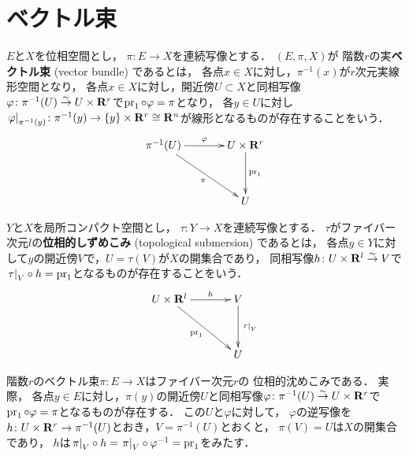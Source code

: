 \section{ベクトル束}
\begin{leftbar}
\begin{DFN}
  \(E\)と\(X\)を位相空間とし，
  \(\pi\colon E\to X\)を連続写像とする．
  \((E,\pi,X)\)が
  階数\(r\)の実\textbf{ベクトル束} (vector bundle) であるとは，
  各点\(x\in X\)に対し，\(\pi^{-1}(x)\)が\(r\)次元実線形空間となり，
  各点\(x\in X\)に対し，開近傍\(U\subset X\)と同相写像\(
    \varphi\colon \pi^{-1}(U)\simar U\times \rr^r
  \)で\(\pr_1\circ\varphi=\pi\)となり，
  各\(y\in U\)に対し\(
    \mres[\varphi]{\pi^{-1}(y)}\colon 
    \pi^{-1}(y)\to \{y\}\times\rr^r\cong \rr^n
  \)が線形となるものが存在することをいう．
  \[\vcenter{\xymatrix@C=36pt@R=36pt{
    \pi^{-1}(U)
    \ar[dr]_-{\pi}
    \ar[r]^-{\varphi}
    &
    U\times \rr^r
    \ar[d]^-{\pr_1}
    \\
    &
    U
  }}\]
\end{DFN}  
\end{leftbar}

\begin{leftbar}
\begin{DFN}[{\cite[Def.3.3.1]{KS90}}]
  \(Y\)と\(X\)を局所コンパクト空間とし，
  \(\tau\colon Y\to X\)を連続写像とする．
  \(\tau\)がファイバー次元\(l\)の\textbf{位相的しずめこみ} (topological submersion) であるとは，
  各点\(y\in Y\)に対して\(y\)の開近傍\(V\)で，\(U=\tau(V)\)が\(X\)の開集合であり，
  同相写像\(h\colon U\times \rr^l\simar V\)で\(\mres[\tau]{V}\circ h=\pr_1\)となるものが存在することをいう．
  \[\vcenter{\xymatrix@C=36pt@R=36pt{
    U\times \rr^l
    \ar[dr]_-{\pr_1}
    \ar[r]^-{h}
    &
    V
    \ar[d]^-{\mres[\tau]{V}}
    \\
    &
    U
  }}\]
\end{DFN} 
\end{leftbar}
  
\begin{EG}\label{bdl-is-subm}
  階数\(r\)のベクトル束\(\pi\colon E\to X\)はファイバー次元\(r\)の
  位相的沈めこみである．
  実際，
  各点\(y\in E\)に対し，\(\pi(y)\)の開近傍\(U\)と同相写像\(
      \varphi\colon \pi^{-1}(U)\simar U\times \rr^r
  \)で\(\pr_1\circ\varphi=\pi\)となるものが存在する．
  この\(U\)と\(\varphi\)に対して，
  \(\varphi\)の逆写像を\(
    h\colon U\times \rr^r \to \pi^{-1}(U)
  \)とおき，\(V= \pi^{-1}(U)\)とおくと，
  \(\pi(V)=U\)は\(X\)の開集合であり，
  \(h\)は\(
    \mres[\pi]{V}\circ h
    =\mres[\pi]{V}\circ \varphi^{-1}
    =\pr_1
  \)をみたす．    
\end{EG}


